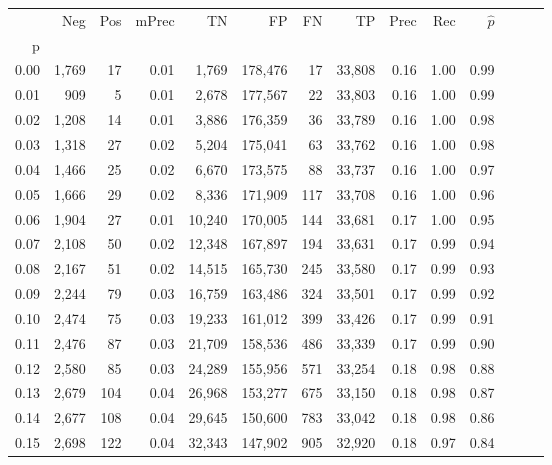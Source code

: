 \begin{tabular}{rrrrrrrrrrrrrr}
\toprule
{} &    Neg &  Pos & mPrec &       TN &       FP &      FN &      TP &  Prec &   Rec & $\hat{p}$ \\
p    &        &      &       &          &          &         &         &       &       &           \\
\midrule
0.00 &  1,769 &   17 &  0.01 &    1,769 &  178,476 &      17 &  33,808 &  0.16 &  1.00 &      0.99 \\
0.01 &    909 &    5 &  0.01 &    2,678 &  177,567 &      22 &  33,803 &  0.16 &  1.00 &      0.99 \\
0.02 &  1,208 &   14 &  0.01 &    3,886 &  176,359 &      36 &  33,789 &  0.16 &  1.00 &      0.98 \\
0.03 &  1,318 &   27 &  0.02 &    5,204 &  175,041 &      63 &  33,762 &  0.16 &  1.00 &      0.98 \\
0.04 &  1,466 &   25 &  0.02 &    6,670 &  173,575 &      88 &  33,737 &  0.16 &  1.00 &      0.97 \\
0.05 &  1,666 &   29 &  0.02 &    8,336 &  171,909 &     117 &  33,708 &  0.16 &  1.00 &      0.96 \\
0.06 &  1,904 &   27 &  0.01 &   10,240 &  170,005 &     144 &  33,681 &  0.17 &  1.00 &      0.95 \\
0.07 &  2,108 &   50 &  0.02 &   12,348 &  167,897 &     194 &  33,631 &  0.17 &  0.99 &      0.94 \\
0.08 &  2,167 &   51 &  0.02 &   14,515 &  165,730 &     245 &  33,580 &  0.17 &  0.99 &      0.93 \\
0.09 &  2,244 &   79 &  0.03 &   16,759 &  163,486 &     324 &  33,501 &  0.17 &  0.99 &      0.92 \\
0.10 &  2,474 &   75 &  0.03 &   19,233 &  161,012 &     399 &  33,426 &  0.17 &  0.99 &      0.91 \\
0.11 &  2,476 &   87 &  0.03 &   21,709 &  158,536 &     486 &  33,339 &  0.17 &  0.99 &      0.90 \\
0.12 &  2,580 &   85 &  0.03 &   24,289 &  155,956 &     571 &  33,254 &  0.18 &  0.98 &      0.88 \\
0.13 &  2,679 &  104 &  0.04 &   26,968 &  153,277 &     675 &  33,150 &  0.18 &  0.98 &      0.87 \\
0.14 &  2,677 &  108 &  0.04 &   29,645 &  150,600 &     783 &  33,042 &  0.18 &  0.98 &      0.86 \\
0.15 &  2,698 &  122 &  0.04 &   32,343 &  147,902 &     905 &  32,920 &  0.18 &  0.97 &      0.84 \\

\end{tabular}
